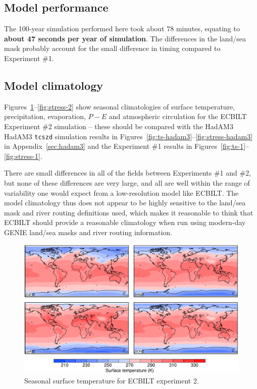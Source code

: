\documentclass[a4paper,11pt]{article}
\begin{document}
\subsection{Model performance}

The 100-year simulation performed here took about 78 minutes, equating
to \textbf{about 47 seconds per year of simulation}.  The differences
in the land/sea mask probably account for the small difference in
timing compared to Experiment \#1.

\subsection{Model climatology}

Figures~\ref{fig:ts-2}--\ref{fig:stress-2} show seasonal climatologies
of surface temperature, precipitation, evaporation, $P-E$ and
atmospheric circulation for the ECBILT Experiment \#2 simulation --
these should be compared with the HadAM3 HadAM3 \texttt{tcszd}
simulation results in
Figures~\ref{fig:ts-hadam3}--\ref{fig:stress-hadam3} in
Appendix~\ref{sec:hadam3} and the Experiment \#1 results in
Figures~\ref{fig:ts-1}--\ref{fig:stress-1}.

There are small differences in all of the fields between Experiments
\#1 and \#2, but none of these differences are very large, and all are
well within the range of variability one would expect from a
low-resolution model like ECBILT.  The model climatology thus does not
appear to be highly sensitive to the land/sea mask and river routing
definitions used, which makes it reasonable to think that ECBILT
should provide a reasonable climatology when run using modern-day
GENIE land/sea masks and river routing information.

\begin{figure}
  \begin{center}
    \includegraphics[width=\textwidth]{../expt-2/plots/ts-plots}
  \end{center}
  \caption{Seasonal surface temperature for ECBILT experiment 2.}
  \label{fig:ts-2}
\end{figure}
\end{document}
